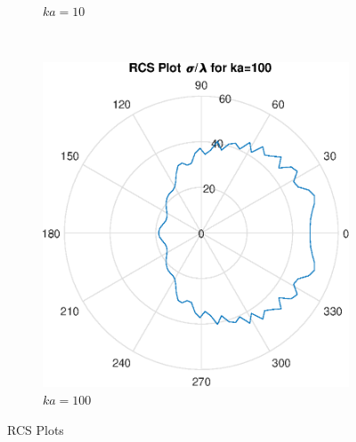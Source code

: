\documentclass[11pt]{amsart}
\begin{document}
\begin{figure}[!h]
\begin{subfigure}[b]{0.45\textwidth}
        \caption{$ka=10$}
        \label{fig:gull}
    \end{subfigure}
    ~ %
    \begin{subfigure}[b]{0.45\textwidth}
        \includegraphics[width=\textwidth]{RCSka100}
        \caption{$ka=100$}
        \label{fig:tiger}
    \end{subfigure}
    \caption{RCS Plots}\label{fig:RCS}
\end{figure}
\newpage
\end{document}
